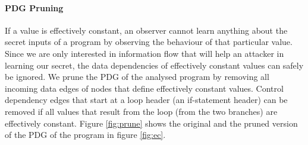 \paragraph{PDG Pruning}
If a value is effectively constant, an observer cannot learn anything about the secret inputs of a program by observing the behaviour of that particular value. Since we are only interested in information flow that will help an attacker in learning our secret, the data dependencies of effectively constant values can safely be ignored. We prune the PDG of the analysed program by removing all incoming data edges of nodes that define effectively constant values.
Control dependency edges that start at a loop header (an if-statement header) can be removed if all values that result from the loop (from the two branches) are effectively constant. Figure \ref{fig:prune} shows the original and the pruned version of the PDG of the program in figure \ref{fig:ec}.


